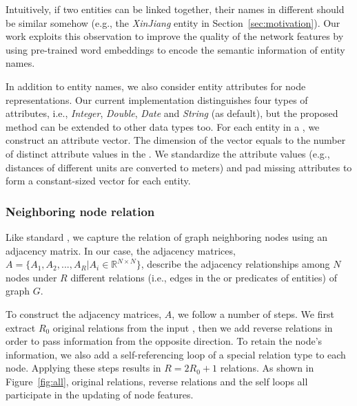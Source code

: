 	
	\label{wordvector}
	Intuitively, if two entities can be linked together, their names in different \KGs should be similar somehow (e.g., the \emph{XinJiang} entity in Section~\ref{sec:motivation}).
    Our work exploits this observation to improve the quality of the network features by using pre-trained word embeddings to encode the semantic
    information of entity names.

	
    In addition to entity names, we also consider entity attributes for node representations.
	Our current implementation distinguishes four types of attributes, i.e., \emph{Integer}, \emph{Double}, \emph{Date} and \emph{String}
    (as default), but the proposed method can be extended to other data types too.
%	
	For each entity in a \KG, we construct an attribute vector. The dimension of the vector equals to the number of distinct attribute values in the \KG.
    We standardize the attribute values (e.g., distances of different units are converted to meters) and pad missing attributes to form a constant-sized
    vector for each entity.

 \subsubsection{Neighboring node relation}
 Like standard \RGCNs, we capture the relation of graph neighboring nodes using an adjacency matrix.
 In our case, the adjacency matrices, $A=\{A_1,A_2,...,A_R |A_i \in \mathbb{R}^{N
 \times N} \}$, describe the adjacency relationships among $N$ nodes under $R$ different relations (i.e., edges in the \KG or predicates of entities) of graph $G$.

 To construct the adjacency matrices, $A$, we follow a number of steps. We first extract $R_0$ original
 relations from the input \KGs, then we add reverse relations in order to pass information from the opposite direction. To retain the node's
 information, we also add a self-referencing loop of a special relation type to each node. Applying these steps results in $R=2R_0+1$ relations. As shown in Figure~\ref{fig:all}, original relations, reverse relations and the self loops all participate in the updating of node features.


